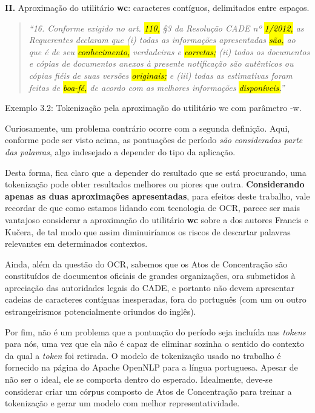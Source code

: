 \documentclass[11pt]{report}
\newcommand{\quotes}[1]{``#1''}
\begin{document}
\textbf{II.} Aproximação do utilitário \textbf{wc}: caracteres contíguos, delimitados entre espaços.

\begin{quote}
  \textit{\quotes{16. Conforme exigido no art. \hl{110,} §3 da Resolução CADE nº \hl{1/2012,} as Requerentes declaram que (i) todas as informações apresentadas \hl{\mbox{são,}} ao que é de seu
  \hl{conhecimento,} verdadeiras e \hl{corretas;} (ii) todos os documentos e cópias de documentos anexos à presente notificação são autênticos ou cópias fiéis de suas versões \hl{originais;}
  e (iii) todas as estimativas foram feitas de \hl{\mbox{boa-fé,}} de acordo com as melhores informações \hl{\mbox{disponíveis.}}}}
\end{quote}
\begin{center}
  Exemplo 3.2: Tokenização pela aproximação do utilitário wc com parâmetro -w.
\end{center}

Curiosamente, um problema contrário ocorre com a segunda definição. Aqui, conforme pode ser visto acima, as pontuações de período \textit{são consideradas parte das palavras}, algo
indesejado a depender do tipo da aplicação.

Desta forma, fica claro que a depender do resultado que se está procurando, uma tokenização pode obter resultados melhores ou piores que outra.
\textbf{Considerando apenas as duas aproximações apresentadas}, para efeitos deste trabalho,
vale recordar de que como estamos lidando com tecnologia de OCR, parece ser mais vantajoso considerar a aproximação do utilitário \textbf{wc} sobre a dos autores
Francis e Kučera, de tal modo que assim diminuiríamos os riscos de descartar palavras relevantes em determinados contextos.

Ainda, além da questão do OCR, sabemos que os Atos de Concentração são constituídos de documentos oficiais de grandes organizações, ora submetidos à apreciação das
autoridades legais do CADE, e portanto não devem apresentar cadeias de caracteres contíguas inesperadas, fora do português (com um ou outro estrangeirismos
potencialmente oriundos do inglês).

Por fim, não é um problema que a pontuação do período seja incluída nas \textit{tokens} para nós, uma vez que ela não é capaz de eliminar sozinha o sentido do contexto da qual
a \textit{token} foi retirada. O modelo de tokenização usado no trabalho é fornecido na página do Apache OpenNLP para a língua portuguesa. Apesar de não ser o ideal, ele se comporta
dentro do esperado. Idealmente, deve-se considerar criar um córpus composto de Atos de Concentração para treinar a tokenização e gerar um modelo com melhor representatividade.
\end{document}
